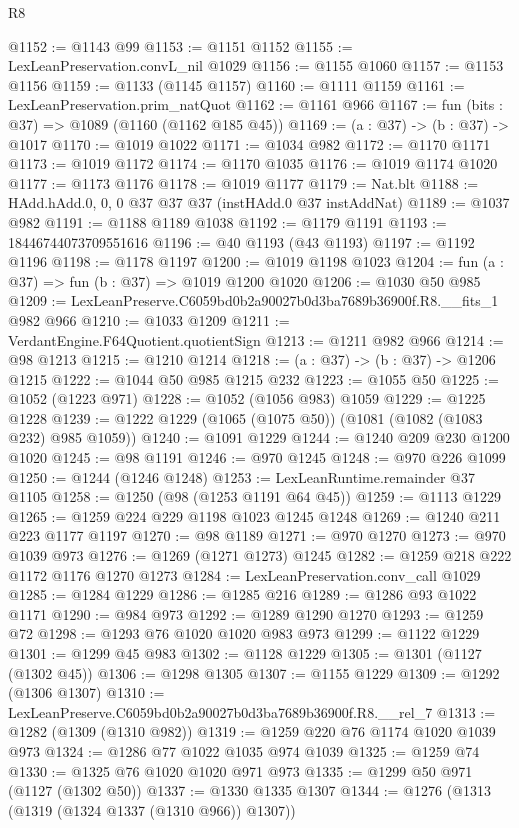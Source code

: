 \begin{lexlean}{R8}
\begin{coremodule}
@1152 := @1143 @99
@1153 := @1151 @1152
@1155 := LexLeanPreservation.convL_nil @1029
@1156 := @1155 @1060
@1157 := @1153 @1156
@1159 := @1133 (@1145 @1157)
@1160 := @1111 @1159
@1161 := LexLeanPreservation.prim_natQuot
@1162 := @1161 @966
@1167 := fun (bits : @37) => @1089 (@1160 (@1162 @185 @45))
@1169 := (a : @37) -> (b : @37) -> @1017
@1170 := @1019 @1022
@1171 := @1034 @982
@1172 := @1170 @1171
@1173 := @1019 @1172
@1174 := @1170 @1035
@1176 := @1019 @1174 @1020
@1177 := @1173 @1176
@1178 := @1019 @1177
@1179 := Nat.blt
@1188 := HAdd.hAdd.{0, 0, 0} @37 @37 @37 (instHAdd.{0} @37 instAddNat)
@1189 := @1037 @982
@1191 := @1188 @1189 @1038
@1192 := @1179 @1191
@1193 := 18446744073709551616
@1196 := @40 @1193 (@43 @1193)
@1197 := @1192 @1196
@1198 := @1178 @1197
@1200 := @1019 @1198 @1023
@1204 := fun (a : @37) => fun (b : @37) => @1019 @1200 @1020
@1206 := @1030 @50 @985
@1209 := LexLeanPreserve.C6059bd0b2a90027b0d3ba7689b36900f.R8.__fits_1 @982 @966
@1210 := @1033 @1209
@1211 := VerdantEngine.F64Quotient.quotientSign
@1213 := @1211 @982 @966
@1214 := @98 @1213
@1215 := @1210 @1214
@1218 := (a : @37) -> (b : @37) -> @1206 @1215
@1222 := @1044 @50 @985 @1215 @232
@1223 := @1055 @50
@1225 := @1052 (@1223 @971)
@1228 := @1052 (@1056 @983) @1059
@1229 := @1225 @1228
@1239 := @1222 @1229 (@1065 (@1075 @50)) (@1081 (@1082 (@1083 @232) @985 @1059))
@1240 := @1091 @1229
@1244 := @1240 @209 @230 @1200 @1020
@1245 := @98 @1191
@1246 := @970 @1245
@1248 := @970 @226 @1099
@1250 := @1244 (@1246 @1248)
@1253 := LexLeanRuntime.remainder @37 @1105
@1258 := @1250 (@98 (@1253 @1191 @64 @45))
@1259 := @1113 @1229
@1265 := @1259 @224 @229 @1198 @1023 @1245 @1248
@1269 := @1240 @211 @223 @1177 @1197
@1270 := @98 @1189
@1271 := @970 @1270
@1273 := @970 @1039 @973
@1276 := @1269 (@1271 @1273) @1245
@1282 := @1259 @218 @222 @1172 @1176 @1270 @1273
@1284 := LexLeanPreservation.conv_call @1029
@1285 := @1284 @1229
@1286 := @1285 @216
@1289 := @1286 @93 @1022 @1171
@1290 := @984 @973
@1292 := @1289 @1290 @1270
@1293 := @1259 @72
@1298 := @1293 @76 @1020 @1020 @983 @973
@1299 := @1122 @1229
@1301 := @1299 @45 @983
@1302 := @1128 @1229
@1305 := @1301 (@1127 (@1302 @45))
@1306 := @1298 @1305
@1307 := @1155 @1229
@1309 := @1292 (@1306 @1307)
@1310 := LexLeanPreserve.C6059bd0b2a90027b0d3ba7689b36900f.R8.__rel_7
@1313 := @1282 (@1309 (@1310 @982))
@1319 := @1259 @220 @76 @1174 @1020 @1039 @973
@1324 := @1286 @77 @1022 @1035 @974 @1039
@1325 := @1259 @74
@1330 := @1325 @76 @1020 @1020 @971 @973
@1335 := @1299 @50 @971 (@1127 (@1302 @50))
@1337 := @1330 @1335 @1307
@1344 := @1276 (@1313 (@1319 (@1324 @1337 (@1310 @966)) @1307))

\end{coremodule}
\end{lexlean}
